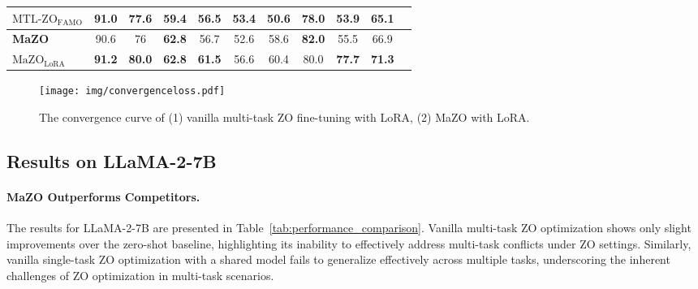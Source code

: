 \begin{table*}[t]
{\begin{tabular}{lcccccccccc}
$\text{MTL-ZO}_{\text{FAMO}}$            & 91.0           & 77.6           & 59.4         & 56.5         & 53.4         & 50.6            & 78.0          & 53.9          & 65.1         \\
\midrule
\textbf{MaZO}     &  90.6  & 76  & \textbf{62.8} & 56.7 & 52.6 & 58.6   & \textbf{82.0} & 55.5 & 66.9 \\ 
\textbf{$\text{MaZO}_{\text{LoRA}}$}     &  \textbf{91.2}  & \textbf{80.0}  & \textbf{62.8} & \textbf{61.5} & 56.6 & 60.4   & 80.0 & \textbf{77.7} & \textbf{71.3} \\ 
\bottomrule
\end{tabular}}
\caption{Performance comparison across tasks using different methods on LLaMA-2-7B. The average score (Avg) is computed across all tasks. Metrics for these tasks are consistent with MeZO \citep{malladi2023mezo}. \textit{Shared model} indicates training on a single task (SST-2) and testing on all tasks. \textit{ICL} refers to in-context learning. \textit{STL} represents single-task learning and \textit{MTL} represents multi-task learning.}

\label{tab:performance_comparison}
\end{table*}



\begin{figure}[t]
    \centering
    
    \texttt{[image: img/convergenceloss.pdf]} 
    \caption{The convergence curve of (1) vanilla multi-task ZO fine-tuning with LoRA, (2) MaZO with LoRA. }
    \vspace{-10pt}
    \label{fig:convergence}
\end{figure} 

\subsection{Results on LLaMA-2-7B}
\paragraph{MaZO Outperforms Competitors.} 
The results for LLaMA-2-7B are presented in Table~\ref{tab:performance_comparison}. Vanilla multi-task ZO optimization shows only slight improvements over the zero-shot baseline, highlighting its inability to effectively address multi-task conflicts under ZO settings. Similarly, vanilla single-task ZO optimization with a shared model fails to generalize effectively across multiple tasks, underscoring the inherent challenges of ZO optimization in multi-task scenarios.

